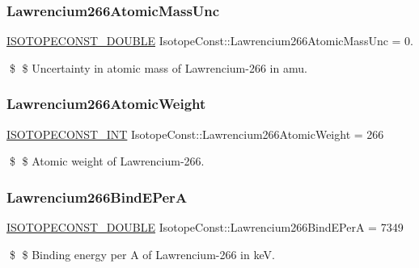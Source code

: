 \subsubsection{\texorpdfstring{Lawrencium266\+Atomic\+Mass\+Unc}{Lawrencium266AtomicMassUnc}}
{\footnotesize\ttfamily \mbox{\hyperlink{group___isotope_const-_macros_ga8f45a7272ce02c0b4c65c44636ed719a}{I\+S\+O\+T\+O\+P\+E\+C\+O\+N\+S\+T\+\_\+\+D\+O\+U\+B\+LE}} Isotope\+Const\+::\+Lawrencium266\+Atomic\+Mass\+Unc = 0.}

\$ \$ Uncertainty in atomic mass of Lawrencium-\/266 in amu. \mbox{\label{group___isotope_const-_lawrencium-_lr266_gae1cf6709b97e10707717ebcb8e586d38}} 
\subsubsection{\texorpdfstring{Lawrencium266\+Atomic\+Weight}{Lawrencium266AtomicWeight}}
{\footnotesize\ttfamily \mbox{\hyperlink{group___isotope_const-_macros_ga5f18360b3e99483a35c32d789e62621c}{I\+S\+O\+T\+O\+P\+E\+C\+O\+N\+S\+T\+\_\+\+I\+NT}} Isotope\+Const\+::\+Lawrencium266\+Atomic\+Weight = 266}

\$ \$ Atomic weight of Lawrencium-\/266. \mbox{\label{group___isotope_const-_lawrencium-_lr266_gaeacc7df659f4f21ac0a8f3402ad0aecb}} 
\subsubsection{\texorpdfstring{Lawrencium266\+Bind\+E\+PerA}{Lawrencium266BindEPerA}}
{\footnotesize\ttfamily \mbox{\hyperlink{group___isotope_const-_macros_ga8f45a7272ce02c0b4c65c44636ed719a}{I\+S\+O\+T\+O\+P\+E\+C\+O\+N\+S\+T\+\_\+\+D\+O\+U\+B\+LE}} Isotope\+Const\+::\+Lawrencium266\+Bind\+E\+PerA = 7349}

\$ \$ Binding energy per A of Lawrencium-\/266 in keV. \mbox{\label{group___isotope_const-_lawrencium-_lr266_gaeffad645a731b55aef92353dbb99c759}} 
